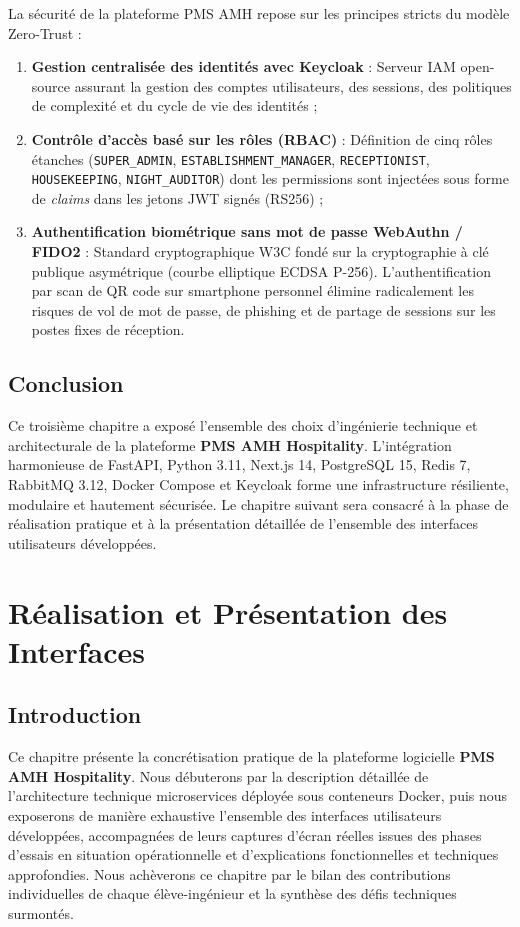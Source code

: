 \documentclass[12pt,a4paper,oneside]{report}
\begin{document}
La sécurité de la plateforme PMS AMH repose sur les principes stricts du modèle Zero-Trust :
\begin{enumerate}
    \item \textbf{Gestion centralisée des identités avec Keycloak} : Serveur IAM open-source assurant la gestion des comptes utilisateurs, des sessions, des politiques de complexité et du cycle de vie des identités ;
    \item \textbf{Contrôle d'accès basé sur les rôles (RBAC)} : Définition de cinq rôles étanches (\texttt{SUPER\_ADMIN}, \texttt{ESTABLISHMENT\_MANAGER}, \texttt{RECEPTIONIST}, \texttt{HOUSEKEEPING}, \texttt{NIGHT\_AUDITOR}) dont les permissions sont injectées sous forme de \textit{claims} dans les jetons JWT signés (RS256) ;
    \item \textbf{Authentification biométrique sans mot de passe WebAuthn / FIDO2} : Standard cryptographique W3C fondé sur la cryptographie à clé publique asymétrique (courbe elliptique ECDSA P-256). L'authentification par scan de QR code sur smartphone personnel élimine radicalement les risques de vol de mot de passe, de phishing et de partage de sessions sur les postes fixes de réception.
\end{enumerate}

\section{Conclusion}

Ce troisième chapitre a exposé l'ensemble des choix d'ingénierie technique et architecturale de la plateforme \textbf{PMS AMH Hospitality}. L'intégration harmonieuse de FastAPI, Python 3.11, Next.js 14, PostgreSQL 15, Redis 7, RabbitMQ 3.12, Docker Compose et Keycloak forme une infrastructure résiliente, modulaire et hautement sécurisée. Le chapitre suivant sera consacré à la phase de réalisation pratique et à la présentation détaillée de l'ensemble des interfaces utilisateurs développées.

\chapter{Réalisation et Présentation des Interfaces}
\label{chap:realisation}

\section{Introduction}

Ce chapitre présente la concrétisation pratique de la plateforme logicielle \textbf{PMS AMH Hospitality}. Nous débuterons par la description détaillée de l'architecture technique microservices déployée sous conteneurs Docker, puis nous exposerons de manière exhaustive l'ensemble des interfaces utilisateurs développées, accompagnées de leurs captures d'écran réelles issues des phases d'essais en situation opérationnelle et d'explications fonctionnelles et techniques approfondies. Nous achèverons ce chapitre par le bilan des contributions individuelles de chaque élève-ingénieur et la synthèse des défis techniques surmontés.
\end{document}
